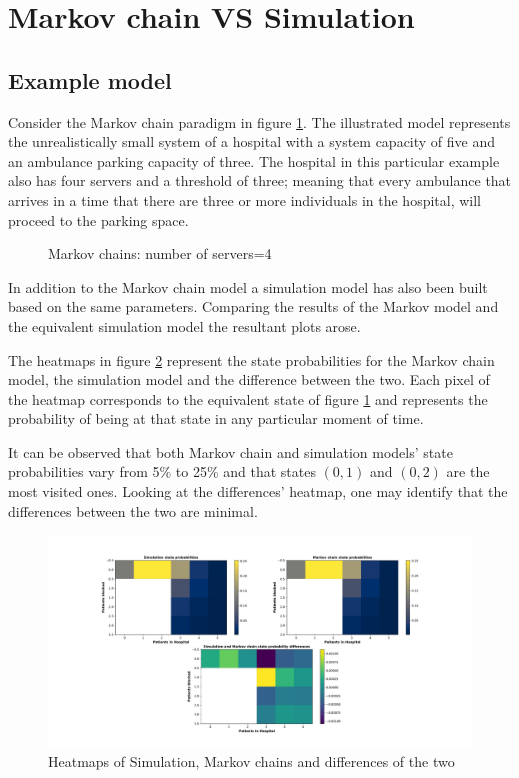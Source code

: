 \section{Markov chain VS Simulation}

\subsection{Example model}
Consider the Markov chain paradigm in figure \ref{Model_mini}. 
The illustrated model represents the unrealistically small system of a hospital 
with a system capacity of five and an ambulance parking capacity of three. 
The hospital in this particular example also has four servers and a threshold of 
three; meaning that every ambulance that arrives in a time that there are three or 
more individuals in the hospital, will proceed to the parking space.

\begin{figure}[h]
    \centering
    
    \caption{Markov chains: number of servers=4} 
    \label{Model_mini}
\end{figure}

In addition to the Markov chain model a simulation model has also been built based 
on the same parameters. 
Comparing the results of the Markov model and the equivalent simulation model the 
resultant plots arose.

The heatmaps in figure \ref{Heatmap_mini} represent the state probabilities for 
the Markov chain model, the simulation model and the difference between the two. 
Each pixel of the heatmap corresponds to the equivalent state of figure \ref{Model_mini} 
and represents the probability of being at that state in any particular moment of time.

It can be observed that both Markov chain and simulation models' state probabilities 
vary from 5\% to 25\% and that states \( (0, 1) \) and \( (0, 2) \) are the most 
visited ones. 
Looking at the differences' heatmap, one may identify that the differences between 
the two are minimal.

\newpage

\begin{figure}[h]
    \includegraphics[width=\linewidth]{Comparisons/Example_model/Heatmap/main.pdf}
    \caption{Heatmaps of Simulation, Markov chains and differences of the two}
    \label{Heatmap_mini}
\end{figure}



